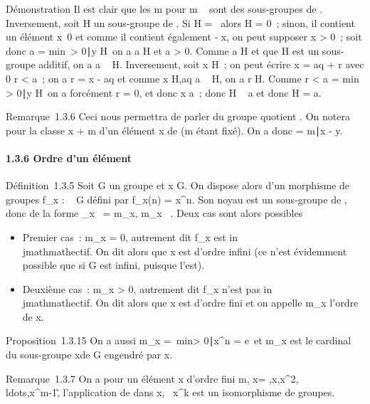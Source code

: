 Démonstration Il est clair que les m pour m \in {}~ sont des sous-groupes
de . Inversement, soit H un sous-groupe de . Si H =
\0\, alors H = 0~; sinon, il contient
un élément x\neq~0 et comme il contient également
- x, on peut supposer x \textgreater{} 0~; soit donc a
= min~\y \textgreater{}
0∣y \in H\, on a a \in H et a
\textgreater{} 0. Comme a \in H et que H est un sous-groupe additif, on a
a \subset~ H. Inversement, soit x \in H~; on peut écrire x = aq + r avec 0 \leq r
\textless{} a~; on a r = x - aq et comme x \in H,aq \in a \subset~ H, on a r \in H.
Comme r \textless{} a = min~\y
\textgreater{} 0∣y \in H\, on
a forcément r = 0, et donc x \in a~; donc H \subset~ a et donc H = a.

Remarque~1.3.6 Ceci nous permettra de parler du groupe quotient \diagupm{}. On
notera \overlinex pour la classe x + m d'un élément
x de  (m étant fixé). On a donc \overlinex =
\overliney \Leftrightarrow
m∣x - y.

\paragraph{1.3.6 Ordre d'un élément}

Définition~1.3.5 Soit G un groupe et x \in G. On dispose alors d'un
morphisme de groupes f_x :  \rightarrow~ G défini par f_x(n) =
x^n. Son noyau est un sous-groupe de , donc de la forme
\mathrmKerf_x~ =
m_x, m_x \in {}~. Deux cas sont alors possibles

\begin{itemize}
\itemsep1pt\parskip0pt
\item
  Premier cas~: m_x = 0, autrement dit f_x est
  in\\jmathmathectif. On dit alors que x est d'ordre infini (ce n'est évidemment
  possible que si G est infini, puisque  l'est).
\item
  Deuxième cas~: m_x \textgreater{} 0, autrement dit
  f_x n'est pas in\\jmathmathectif. On dit alors que x est d'ordre fini
  et on appelle m_x l'ordre de x.
\end{itemize}

Proposition~1.3.15 On a aussi m_x =\
min\n \textgreater{}
0∣x^n = e\ et
m_x est le cardinal du sous-groupe \langle
x\rangle de G engendré par x.

Remarque~1.3.7 On a pour un élément x d'ordre fini m,
\langle x\rangle =
\e,x,x^2,\\ldots,x^m-1\~,
l'application de \diagupn{} dans \langle
x\rangle ,
\overlinek\mapsto~x^k
est un isomorphisme de groupes.

